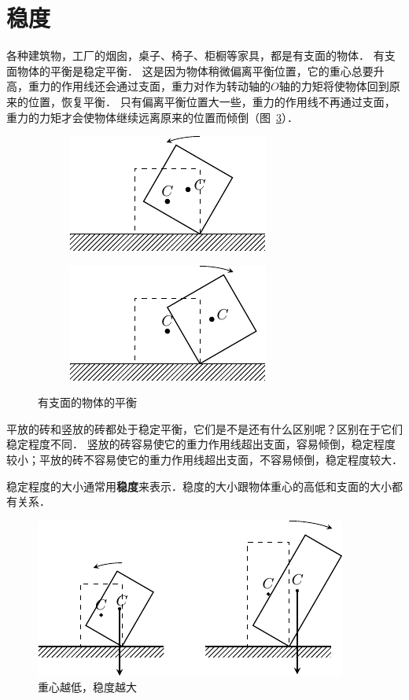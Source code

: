 \section{稳度}
各种建筑物，工厂的烟囱，桌子、椅子、柜橱等家具，都是有支面的物体．
有支面物体的平衡是稳定平衡．
这是因为物体稍微偏离平衡位置，它的重心总要升高，重力的作用线还会通过支面，重力对作为转动轴的$O$轴的力矩将使物体回到原来的位置，恢复平衡．
只有偏离平衡位置大一些，重力的作用线不再通过支面，重力的力矩才会使物体继续远离原来的位置而倾倒（图~\ref{fig_A_6-18}）．
\begin{figure}[htbp]
    \centering
    \begin{subfigure} {0.49\linewidth} 
        \centering
        \includegraphics{fig/A/6-18a.pdf} 
        \caption{}\label{fig_A_6-18a} 
    \end{subfigure}
    \begin{subfigure} {0.49\linewidth} 
        \centering
        \includegraphics{fig/A/6-18b.pdf} 
        \caption{}\label{fig_A_6-18b} 
    \end{subfigure}
    \caption{有支面的物体的平衡}\label{fig_A_6-18}
\end{figure}

平放的砖和竖放的砖都处于稳定平衡，它们是不是还有什么区别呢？区别在于它们稳定程度不同．
竖放的砖容易使它的重力作用线超出支面，容易倾倒，稳定程度较小；平放的砖不容易使它的重力作用线超出支面，不容易倾倒，稳定程度较大．

稳定程度的大小通常用\textbf{稳度}来表示．稳度的大小跟物体重心的高低和支面的大小都有关系．
\begin{figure}[htbp]
	\centering
	\includegraphics{fig/A/6-19.pdf}
	\caption{重心越低，稳度越大}\label{fig_A_6-19}
\end{figure}

